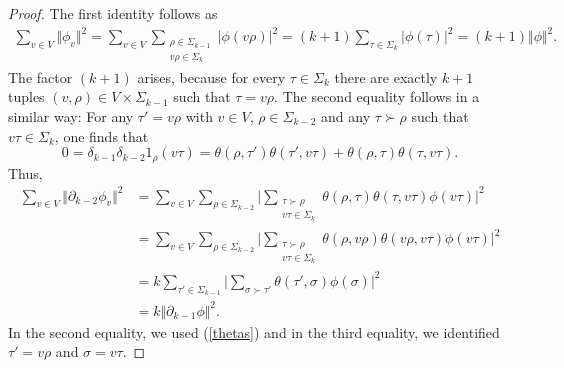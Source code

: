 \documentclass[10pt,a4paper]{amsart}
\begin{document}
\begin{proof}
    The first identity follows as 
    \begin{align*}
        \sum_{v\in V}\Vert\phi_v\Vert^2 = \sum_{v\in V}\sum_{\substack{\rho\in\Sigma_{k-1}\\v\rho\in\Sigma_k}}\vert\phi(v\rho)\vert^2 = (k+1)\sum_{\tau\in\Sigma_k}\vert\phi(\tau)\vert^2 = (k+1)\Vert\phi\Vert^2.
    \end{align*}
    The factor $(k+1)$ arises, because for every $\tau\in\Sigma_k$ there are exactly $k+1$ tuples $(v,\rho)\in V\times\Sigma_{k-1}$ such that $\tau = v\rho.$
    The second equality follows in a similar way: For any $\tau' = v\rho$ with $v\in V$, $\rho\in\Sigma_{k-2}$ and any $\tau\succ\rho$ such that $v\tau\in\Sigma_k$, one finds that 
    \begin{equation}\label{thetas}
        0 = \delta_{k-1}\delta_{k-2} 1_\rho(v\tau) = \theta(\rho,\tau')\theta(\tau',v\tau)+\theta(\rho,\tau)\theta(\tau,v\tau).
    \end{equation}
    Thus,
    \begin{align*}
        \sum_{v\in V}\Vert\partial_{k-2}\phi_v\Vert^2 &=\sum_{v\in V} \sum_{\rho\in\Sigma_{k-2}}\Big\vert\sum_{\substack{\tau\succ\rho\\v\tau\in\Sigma_k}}\theta(\rho,\tau)\theta(\tau,v\tau)\phi(v\tau)\Big\vert^2\\
        & = \sum_{v\in V}\sum_{\rho\in\Sigma_{k-2}}\Big\vert\sum_{\substack{\tau\succ\rho\\v\tau\in\Sigma_k}}\theta(\rho,v\rho)\theta(v\rho,v\tau)\phi(v\tau)\Big\vert^2\\
        & = k\sum_{\tau'\in\Sigma_{k-1}}\Big\vert\sum_{\sigma\succ\tau'}\theta(\tau',\sigma)\phi(\sigma)\Big\vert^2\\
        &=k\Vert\partial_{k-1}\phi\Vert^2.
    \end{align*}
In the second equality, we used (\ref{thetas}) and in the third equality, we identified $\tau' = v\rho$ and $\sigma = v\tau.$
\end{proof}
\end{document}
